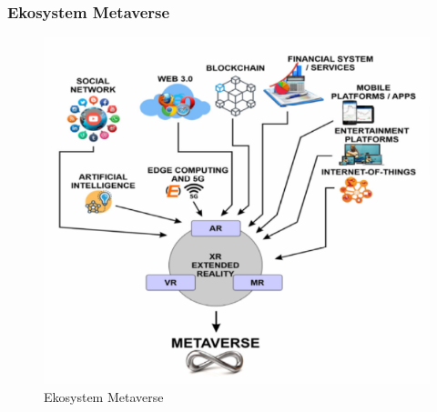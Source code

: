 \subsubsection{Ekosystem Metaverse}

\begin{figure}[!htbp]
    \centering
    \includegraphics[width=\textwidth]{images/metaverse/metaverseEcosystem.png}
    \caption{Ekosystem Metaverse\cite{metaverseSecurityIssuesChallengesAndViableZTAModel}}
    \label{metaverseEcosystemImage}
\end{figure}


